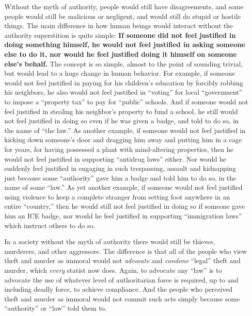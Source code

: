 \documentclass{book}
\begin{document}
Without the myth of authority, people would still have disagreements, and some people would still be malicious or negligent, and would still do stupid or hostile things. The main difference in how human beings would interact without the authority superstition is quite simple: \textbf{If someone did not feel justified in doing something himself, he would not feel justified in asking someone else to do it, nor would he feel justified doing it himself on someone else's behalf.} The concept is so simple, almost to the point of sounding trivial, but would lead to a huge change in human behavior. For example, if someone would not feel justified in paying for his children's education by forcibly robbing his neighbors, he also would not feel justified in \enquote{voting} for local \enquote{government} to impose a \enquote{property tax} to pay for \enquote{public} schools. And if someone would not feel justified in stealing his neighbor's property to fund a school, he still would not feel justified in doing so even if he was given a badge, and told to do so, in the name of \enquote{the law.} As another example, if someone would not feel justified in kicking down someone's door and dragging him away and putting him in a cage for years, for having possessed a plant with mind-altering properties, then he would not feel justified in supporting \enquote{antidrug laws} either. Nor would he suddenly feel justified in engaging in such trespassing, assault and kidnapping just because some \enquote{authority} gave him a badge and told him to do so, in the name of some \enquote{law.} As yet another example, if someone would not feel justified using violence to keep a complete stranger from setting foot anywhere in an entire \enquote{country,} then he would still not feel justified in doing so if someone gave him an ICE badge, nor would he feel justified in supporting \enquote{immigration laws} which instruct others to do so.

In a society without the myth of authority there would still be thieves, murderers, and other aggressors. The difference is that all of the people who view theft and murder as immoral would not \emph{advocate} and \emph{condone} \enquote{legal} theft and murder, which \emph{every} statist now does. Again, to advocate any \enquote{law} is to advocate the use of whatever level of authoritarian force is required, up to and including deadly force, to achieve compliance. And the people who perceived theft and murder as immoral would not commit such acts simply because some \enquote{authority} or \enquote{law} told them to.
\end{document}
